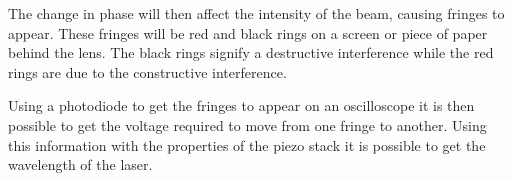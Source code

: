 The change in phase will then affect the intensity of the beam, causing fringes to appear. These fringes will be red and black rings on a screen or piece of paper behind the lens. The black rings signify a destructive interference while the red rings are due to the constructive interference. 

Using a photodiode to get the fringes to appear on an oscilloscope it is then possible to get the voltage required to move from one fringe to another. Using this information with the properties of the piezo stack it is possible to get the wavelength of the laser. 


